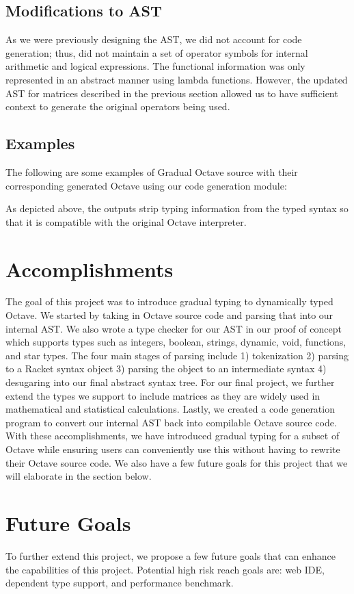 \subsection{Modifications to AST}
As we were previously designing the AST, we did not account for code generation; thus, did not maintain a set of operator symbols for internal arithmetic and logical expressions. The functional information was only represented in an abstract manner using lambda functions. However, the updated AST for matrices described in the previous section allowed us to have sufficient context to generate the original operators being used.

\subsection{Examples}
The following are some examples of Gradual Octave source with their corresponding generated Octave using our code generation module:

As depicted above, the outputs strip typing information from the typed syntax so that it is compatible with the original Octave interpreter.

\section{Accomplishments}
The goal of this project was to introduce gradual typing to dynamically typed Octave. We started by taking in Octave source code and parsing that into our internal AST. We also wrote a type checker for our AST in our proof of concept which supports types such as integers, boolean, strings, dynamic, void, functions, and star types. The four main stages of parsing include 1) tokenization 2) parsing to a Racket syntax object 3) parsing the object to an intermediate syntax 4) desugaring into our final abstract syntax tree. For our final project, we further extend the types we support to include matrices as they are widely used in mathematical and statistical calculations. Lastly, we created a code generation program to convert our internal AST back into compilable Octave source code. With these accomplishments, we have introduced gradual typing for a subset of Octave while ensuring users can conveniently use this without having to rewrite their Octave source code. We also have a few future goals for this project that we will elaborate in the section below.

\section{Future Goals}
To further extend this project, we propose a few future goals that can enhance the capabilities of this project. Potential high risk reach goals are: web IDE, dependent type support, and performance benchmark.

